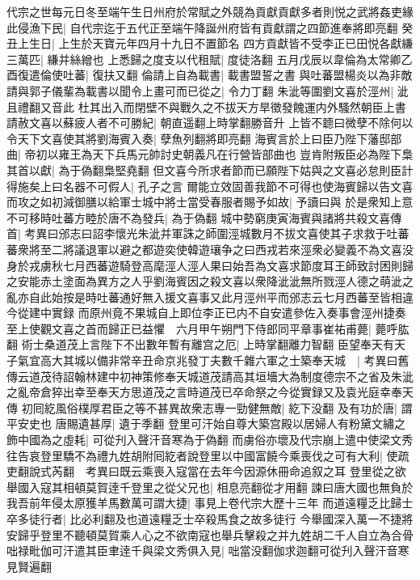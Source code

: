 代宗之世每元日冬至端午生日州府於常賦之外競為貢獻貢獻多者則悦之武將姦吏緣此侵漁下民|{
	自代宗迄于五代正至端午降誕州府皆有貢獻謂之四節進奉將即亮翻}
癸丑上生日|{
	上生於天寶元年四月十九日不置節名}
四方貢獻皆不受李正已田悦各獻縑三萬匹|{
	縑并絲繒也}
上悉歸之度支以代租賦|{
	度徒洛翻}
五月戊辰以韋倫為太常卿乙酉復遣倫使吐蕃|{
	復扶又翻}
倫請上自為載書|{
	載書盟誓之書}
與吐蕃盟楊炎以為非敵請與郭子儀輩為載書以聞令上畫可而已從之|{
	令力丁翻}
朱泚等圍劉文喜於涇州|{
	泚且禮翻又音此}
杜其出入而閉壁不與戰久之不拔天方旱徵發餽運内外騷然朝臣上書請赦文喜以蘇疲人者不可勝紀|{
	朝直遥翻上時掌翻勝音升}
上皆不聼曰微孽不除何以令天下文喜使其將劉海賓入奏|{
	孽魚列翻將即亮翻}
海賓言於上曰臣乃陛下藩邸部曲|{
	帝初以雍王為天下兵馬元帥討史朝義凡在行營皆部曲也}
豈肯附叛臣必為陛下梟其首以獻|{
	為于偽翻梟堅堯翻}
但文喜今所求者節而已願陛下姑與之文喜必怠則臣計得施矣上曰名器不可假人|{
	孔子之言}
爾能立效固善我節不可得也使海賓歸以告文喜而攻之如初減御膳以給軍士城中將士當受春服者賜予如故|{
	予讀曰與}
於是衆知上意不可移時吐蕃方睦於唐不為發兵|{
	為于偽翻}
城中勢窮庚寅海賓與諸將共殺文喜傳首|{
	考異曰邠志曰詔李懷光朱泚并軍誅之師圍涇城數月不拔文喜使其子求救于吐蕃蕃衆將至二將議退軍以避之都遊奕使韓遊瓖争之曰西戎若來涇衆必變義不為文喜没身於戎虜秋七月西蕃遊騎登高麾涇人涇人果曰始吾為文喜求節度耳王師致討困則歸之安能赤土塗面為異方之人乎劉海賓因之殺文喜以衆降泚泚無所戮涇人德之萌泚之亂亦自此始按是時吐蕃通好無入援文喜事又此月涇州平而邠志云七月西蕃至皆相違今從建中實録}
而原州竟不果城自上即位李正已内不自安遣參佐入奏事會涇州捷奏至上使觀文喜之首而歸正已益懼　六月甲午朔門下侍郎同平章事崔祐甫薨|{
	薨呼肱翻}
術士桑道茂上言陛下不出數年暫有離宫之厄|{
	上時掌翻離力智翻}
臣望奉天有天子氣宜高大其城以備非常辛丑命京兆發丁夫數千雜六軍之士築奉天城　|{
	考異曰舊傳云道茂待詔翰林建中初神策修奉天城道茂請高其垣墻大為制度德宗不之省及朱泚之亂帝倉猝出幸至奉天方思道茂之言時道茂已卒命祭之今從實録又及袁光庭幸奉天傳}
初囘紇風俗樸厚君臣之等不甚異故衆志專一勁健無敵|{
	紇下没翻}
及有功於唐|{
	謂平安史也}
唐賜遺甚厚|{
	遺于季翻}
登里可汗始自尊大築宫殿以居婦人有粉黛文繡之飾中國為之虛耗|{
	可從刋入聲汗音寒為于偽翻}
而虜俗亦壞及代宗崩上遣中使梁文秀往告哀登里驕不為禮九姓胡附囘紇者說登里以中國富饒今乘喪伐之可有大利|{
	使疏吏翻說式芮翻　考異曰既云乘喪入寇當在去年今因源休冊命追叙之耳}
登里從之欲舉國入寇其相頓莫賀逹千登里之從父兄也|{
	相息亮翻從才用翻}
諫曰唐大國也無負於我吾前年侵太原獲羊馬數萬可謂大捷|{
	事見上卷代宗大歷十三年}
而道遠糧乏比歸士卒多徒行者|{
	比必利翻及也道遠糧乏士卒殺馬食之故多徒行}
今舉國深入萬一不捷將安歸乎登里不聽頓莫賀乘人心之不欲南寇也舉兵擊殺之并九姓胡二千人自立為合骨咄禄毗伽可汗遣其臣聿逹千與梁文秀俱入見|{
	咄當没翻伽求迦翻可從刋入聲汗音寒見賢遍翻}
